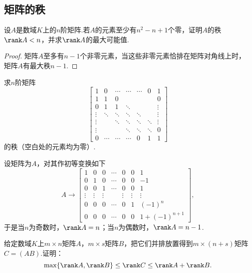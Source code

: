 \subsection{矩阵的秩}
\begin{prob}[4]
	设$A$是数域$K$上的$n$阶矩阵.若$A$的元素至少有$n^2-n+1$个零，证明$A$的秩$\rank A<n$，并求$\rank A$的最大可能值.
\end{prob}
\begin{proof}
	矩阵$A$至多有$n-1$个非零元素，当这些非零元素恰排在矩阵对角线上时，矩阵$A$有最大秩$n-1$.
\end{proof}
\begin{prob}[8]
	求$n$阶矩阵
	\[\begin{bmatrix}
			1      & 0      & \cdots & \cdots & \cdots & 0      & 1      \\
			1      & 1      & 0      &        &        &        & 0      \\
			0      & 1      & 1      & \ddots &        &        & \vdots \\
			\vdots & \ddots & \ddots & \ddots & \ddots &        & \vdots \\
			\vdots &        & \ddots & \ddots & \ddots & \ddots & \vdots \\
			\vdots &        &        & \ddots & \ddots & \ddots & 0      \\
			0      & \cdots & \cdots & \cdots & 0      & 1      & 1
		\end{bmatrix}\]
	的秩（空白处的元素均为零）.
\end{prob}
\begin{sol}
	设矩阵为$A$，对其作初等变换如下
	\[A\longrightarrow
		\begin{bmatrix}
			1      & 0      & 0      & \cdots & 0      & 0      & 1            \\
			0      & 1      & 0      & \cdots & 0      & 0      & -1           \\
			0      & 0      & 1      & \cdots & 0      & 0      & 1            \\
			\vdots & \vdots & \vdots &        & \vdots & \vdots & \vdots       \\
			0      & 0      & 0      & \cdots & 0      & 1      & (-1)^{n}     \\
			0      & 0      & 0      & \cdots & 0      & 0      & 1+(-1)^{n+1}
		\end{bmatrix},
	\]
	于是当$n$为奇数时，$\rank A=n$；当$n$为偶数时，$\rank A=n-1$.
\end{sol}
\begin{prob}[9]
	给定数域$K$上$m\times n$矩阵$A$，$m\times s$矩阵$B$，把它们并排放置得到$m\times(n+s)$矩阵$C=(AB)$.\hypertarget{MatrixRankPartition}{证明}：
	\[
		\max\{\rank A,\rank B\}\le\rank C\le\rank A+\rank B.
	\]
\end{prob}
